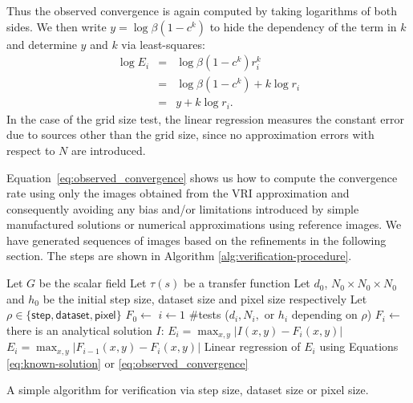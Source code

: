 Thus the observed convergence is again computed by taking logarithms
of both sides. We then write $y = \log
\beta (  1 - c^k )$ to hide the dependency of the term in $k$
and determine $y$ and $k$ via least-squares:
\begin{eqnarray}
\log E_i &=& \log \beta (  1 - c^k ) r_i^k\\ 
&=& \log \beta (  1 - c^k ) + k \log r_i \\
&=& y + k \log r_i. \label{eq:observed_convergence}
\end{eqnarray}
In the case of the grid size test, the linear regression measures the 
constant error due to sources other than the grid size, since no 
approximation errors with respect to $N$ are introduced.


Equation~\eqref{eq:observed_convergence} shows us how to compute the
convergence rate using only the images obtained from the VRI
approximation and consequently avoiding any bias and/or limitations
introduced by simple manufactured solutions or numerical
approximations using reference images. We have generated sequences of
images based on the refinements in the following section.  The steps
are shown in Algorithm \ref{alg:verification-procedure}.

\begin{algorithm}[t]
\begin{codebox}
\li \Comment Let $G$ be the scalar field
\li \Comment Let $\tau(s)$ be a transfer function
\li \Comment Let $d_0$, $N_0 \times N_0 \times N_0$ and $h_0$ be the initial step size,
\zi  dataset size and pixel size respectively
\li \Comment Let  $\rho \in \{ \textsf{step}, \textsf{dataset}, \textsf{pixel} \}$
\li $F_0 \gets$ 
\li \For $i \gets 1$ \To $\#$tests
\li     \Do {}($d_i, N_i, \text{ or } h_i$ depending on $\rho$)
\li         $F_i \gets$ 
\li         \If there is an analytical solution $I$:
\li            \Then $E_i = \max_{x,y} | I(x,y) - F_{i}(x,y)|$
\li         \Else  $E_i = \max_{x,y} | F_{i-1}(x,y) - F_{i}(x,y)|$
            \End
       \End
\li Linear regression of $E_i$ using Equations
\eqref{eq:known-solution} or \eqref{eq:observed_convergence}
\end{codebox}
\caption{A simple algorithm for verification via step size, dataset
  size or pixel size.}
\label{alg:verification-procedure}
\end{algorithm}


